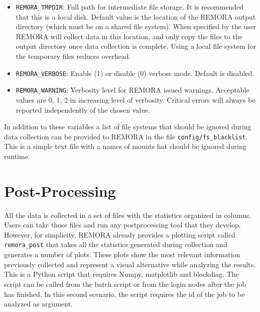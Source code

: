 \documentclass[10pt,a4paper]{report}
\begin{document}
{\begin{itemize}
	\item \texttt{REMORA\_TMPDIR}: Full path for intermediate file storage. It is recommended that this is a local disk. Default value is the location of the REMORA output directory (which must be on a shared file system). When specified by the user REMORA will collect data in this location, and only copy the files to the output directory once data collection is complete. Using a local file system for the temporary files reduces overhead. 
	
	\item \texttt{REMORA\_VERBOSE}: Enable (1) or disable (0) verbose mode. Default is disabled.
	
	\item \texttt{REMORA\_WARNING}: Verbosity level for REMORA issued warnings. Acceptable values are 0, 1, 2 in increasing level of verbosity. Critical errors will always be reported independently of the chosen value.
\end{itemize}
}

In addition to these variables a list of file systems that should be ignored during data collection can be provided to REMORA in the file \verb+config/fs_blacklist+. This is a simple text file with a names of mounts hat should be ignored during runtime.

\section{Post-Processing}
All the data is collected in a set of files with the statistics organized in columns. Users can take those files and run any postprocessing tool that they develop. However, for simplicity, REMORA already provides a plotting script called \verb+remora_post+ that takes all the statistics generated during collection and generates a number of plots. These plots show the most relevant information previously collected and represent a visual alternative while analyzing the results. This is a Python script that requires Numpy, matplotlib and blockdiag. The script can be called from the batch script or from the login nodes after the job has finished. In this second scenario, the script requires the id of the job to be analyzed as argument.

\FloatBarrier
\end{document}
